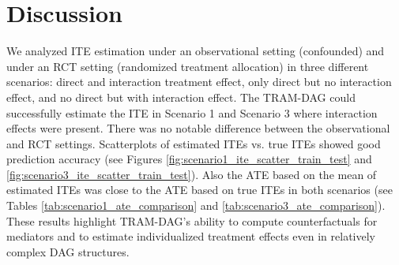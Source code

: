 








\FloatBarrier


\section{Discussion} \label{sec:disc_experiment4}


We analyzed ITE estimation under an observational setting (confounded) and under an RCT setting (randomized treatment allocation) in three different scenarios: direct and interaction treatment effect, only direct but no interaction effect, and no direct but with interaction effect. The TRAM-DAG could successfully estimate the ITE in Scenario 1 and Scenario 3 where interaction effects were present. There was no notable difference between the observational and RCT settings. Scatterplots of estimated ITEs vs. true ITEs showed good prediction accuracy (see Figures \ref{fig:scenario1_ite_scatter_train_test} and \ref{fig:scenario3_ite_scatter_train_test}). Also the ATE based on the mean of estimated ITEs was close to the ATE based on true ITEs in both scenarios (see Tables \ref{tab:scenario1_ate_comparison} and \ref{tab:scenario3_ate_comparison}). These results highlight TRAM-DAG's ability to compute counterfactuals for mediators and to estimate individualized treatment effects even in relatively complex DAG structures.



